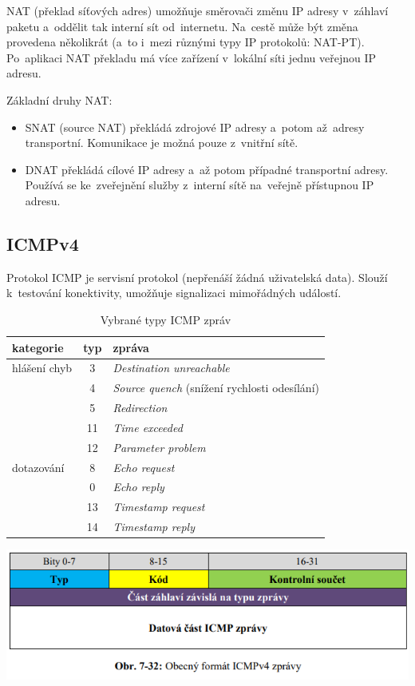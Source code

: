NAT (překlad síťových adres) umožňuje směrovači změnu IP adresy v~záhlaví paketu a~oddělit tak interní sít od~internetu. Na~cestě může být změna provedena několikrát (a~to i~mezi různými typy IP protokolů: NAT-PT). Po~aplikaci NAT překladu má více zařízení v~lokální síti jednu veřejnou IP adresu.

Základní druhy NAT:
\begin{itemize}
    \item SNAT (source NAT) překládá zdrojové IP adresy a~potom až~adresy transportní. Komunikace je možná pouze z~vnitřní sítě.
    \item DNAT překládá cílové IP adresy a~až potom případné transportní adresy. Používá se ke~zveřejnění služby z~interní sítě na~veřejně přístupnou IP adresu.
\end{itemize}

\subsection{ICMPv4}

Protokol ICMP je servisní protokol (nepřenáší žádná uživatelská data). Slouží k~testování konektivity, umožňuje signalizaci mimořádných událostí.

\begin{table}[ht]
	\centering
	\caption{Vybrané typy ICMP zpráv}
	\begin{tabular}{|l|c|l|}
		\hline
		kategorie    & typ & zpráva \\\hline\hline
		hlášení chyb & 3   & \emph{Destination unreachable} \\
		             & 4   & \emph{Source quench} (snížení rychlosti odesílání) \\
		             & 5   & \emph{Redirection} \\
		             & 11  & \emph{Time exceeded} \\
		             & 12  & \emph{Parameter problem} \\
		\hline
		dotazování   & 8   & \emph{Echo request} \\
		             & 0   & \emph{Echo reply} \\
		             & 13  & \emph{Timestamp request} \\
		             & 14  & \emph{Timestamp reply} \\
		\hline
	\end{tabular}
\end{table}

\begin{center}
	\includegraphics[scale=0.5]{images/-044.png}
\end{center}

